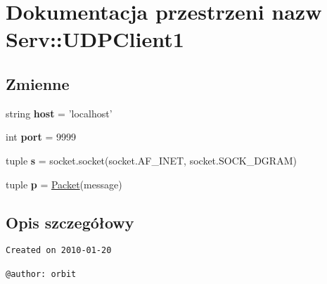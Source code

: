 \hypertarget{namespace_serv_1_1_u_d_p_client1}{
\section{Dokumentacja przestrzeni nazw Serv::UDPClient1}
\label{namespace_serv_1_1_u_d_p_client1}
}
\subsection*{Zmienne}
\begin{CompactItemize}
\item 
\hypertarget{namespace_serv_1_1_u_d_p_client1_1c083a48b797a20f54695f5f04a55fbd}{
string \textbf{host} = 'localhost'}
\label{namespace_serv_1_1_u_d_p_client1_1c083a48b797a20f54695f5f04a55fbd}

\item 
\hypertarget{namespace_serv_1_1_u_d_p_client1_19ea7a101002ec92988b4b88c69f56cd}{
int \textbf{port} = 9999}
\label{namespace_serv_1_1_u_d_p_client1_19ea7a101002ec92988b4b88c69f56cd}

\item 
\hypertarget{namespace_serv_1_1_u_d_p_client1_30d457e78e8df51c992f0481290cdf21}{
tuple \textbf{s} = socket.socket(socket.AF\_\-INET, socket.SOCK\_\-DGRAM)}
\label{namespace_serv_1_1_u_d_p_client1_30d457e78e8df51c992f0481290cdf21}

\item 
\hypertarget{namespace_serv_1_1_u_d_p_client1_f17cbd754c908d1407b2b97f5ed053fe}{
tuple \textbf{p} = \hyperlink{class_serv_1_1_packet_1_1_packet}{Packet}(message)}
\label{namespace_serv_1_1_u_d_p_client1_f17cbd754c908d1407b2b97f5ed053fe}

\end{CompactItemize}


\subsection{Opis szczegółowy}


\footnotesize\begin{verbatim}
Created on 2010-01-20

@author: orbit
\end{verbatim}
\normalsize
 

